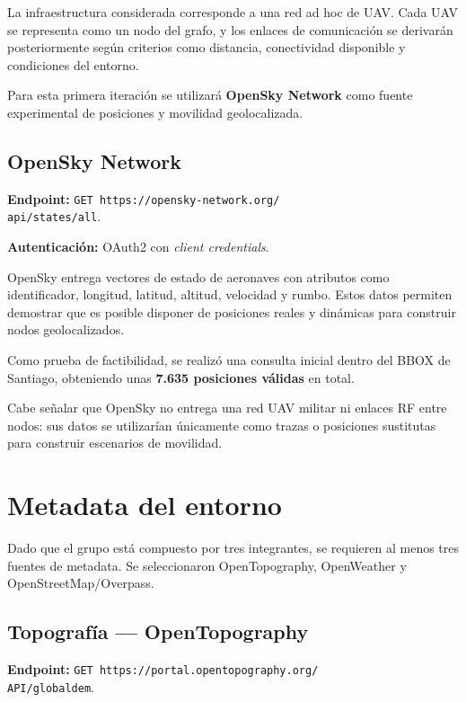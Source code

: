 \documentclass[journal,10pt]{IEEEtran}
\begin{document}
La infraestructura considerada corresponde a una red ad hoc de UAV. Cada UAV se representa como
un nodo del grafo, y los enlaces de comunicación se derivarán posteriormente según criterios como
distancia, conectividad disponible y condiciones del entorno.

Para esta primera iteración se utilizará \textbf{OpenSky Network} como fuente experimental de
posiciones y movilidad geolocalizada.

\subsection{OpenSky Network}

\textbf{Endpoint:}
\texttt{GET https://opensky-network.org/ \\ api/states/all}.

\textbf{Autenticación:} OAuth2 con \textit{client credentials}.

OpenSky entrega vectores de estado de aeronaves con atributos como identificador, longitud,
latitud, altitud, velocidad y rumbo. Estos datos permiten demostrar que es posible disponer de
posiciones reales y dinámicas para construir nodos geolocalizados.

Como prueba de factibilidad, se realizó una consulta inicial dentro del BBOX de Santiago, obteniendo unas \textbf{7.635 posiciones válidas} en total.

Cabe señalar que OpenSky no entrega una red UAV militar ni enlaces
RF entre nodos: sus datos se utilizarían únicamente como trazas o posiciones sustitutas para
construir escenarios de movilidad.

\section{Metadata del entorno}

Dado que el grupo está compuesto por tres integrantes, se requieren al menos tres fuentes de
metadata. Se seleccionaron OpenTopography, OpenWeather y OpenStreetMap/Overpass.

\subsection{Topografía --- OpenTopography}

\textbf{Endpoint:}
\texttt{GET https://portal.opentopography.org/ \\ API/globaldem}.
\end{document}
